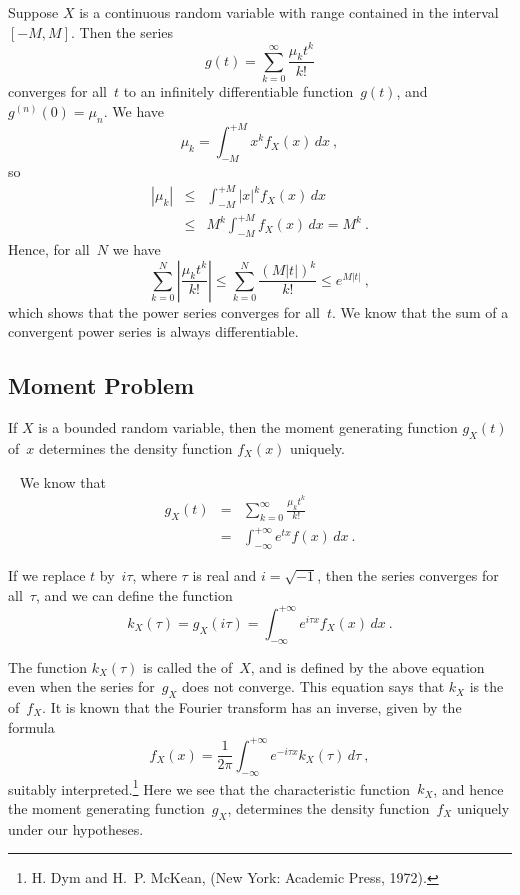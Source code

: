 \begin{theorem}\label{thm 10.4}
Suppose $X$ is a continuous random variable with range contained in the
interval $[-M,M]$.  Then the series
$$
g(t) = \sum_{k = 0}^\infty \frac{\mu_k t^k}{k!}
$$
converges for all~$t$ to an infinitely differentiable function~$g(t)$, and
$g^{(n)}(0) = \mu_n$.
\proof
We have
$$
\mu_k = \int_{-M}^{+M} x^k f_X(x)\, dx\ ,
$$
so
\begin{eqnarray*}
|\mu_k| &\leq& \int_{-M}^{+M} |x|^k f_X(x)\, dx \\
        &\leq& M^k \int_{-M}^{+M} f_X(x)\, dx = M^k\ .
\end{eqnarray*}
Hence, for all~$N$ we have
$$
\sum_{k = 0}^N \left|\frac{\mu_k t^k}{k!}\right| \leq \sum_{k = 0}^N
\frac{(M|t|)^k}{k!} \leq e^{M|t|}\ ,
$$
which shows that the power series converges for all~$t$.  We know that the sum
of a convergent power series is always differentiable.
\end{theorem}

\subsection*{Moment Problem}

\begin{theorem}\label{thm 10.5}
If $X$ is a bounded random variable, then the moment generating function
$g_X(t)$ of~$x$ determines the density function $f_X(x)$ uniquely.
\vspace{.385in} 

\noindent {}~                                             
We know that
\begin{eqnarray*}
g_X(t) &=& \sum_{k = 0}^\infty \frac{\mu_k t^k}{k!} \\
       &=& \int_{-\infty}^{+\infty} e^{tx} f(x)\, dx\ .
\end{eqnarray*}


\noindent If we replace $t$ by~$i\tau$, where $\tau$ is real and $i = \sqrt{-1}$, then
the series converges for all~$\tau$, and we can define the function
$$
k_X(\tau) = g_X(i\tau) = \int_{-\infty}^{+\infty} e^{i\tau x} f_X(x)\, dx\ .
$$

The function $k_X(\tau)$ is called the  of~$X$, and is defined by the above equation even when the series for~$g_X$ does not
converge.  This equation says that $k_X$ is the  of~$f_X$.  It is known that the Fourier transform has an inverse, given by the
formula
$$
f_X(x) = \frac1{2\pi} \int_{-\infty}^{+\infty} e^{-i\tau x} k_X(\tau)\, d\tau\ ,
$$
suitably interpreted.\footnote{H. Dym and H.~P. McKean,  (New York: Academic Press, 1972).}  Here we see that the
characteristic function~$k_X$, and hence the moment generating function~$g_X$,
determines the density function~$f_X$ uniquely under our hypotheses.
\end{theorem} 

